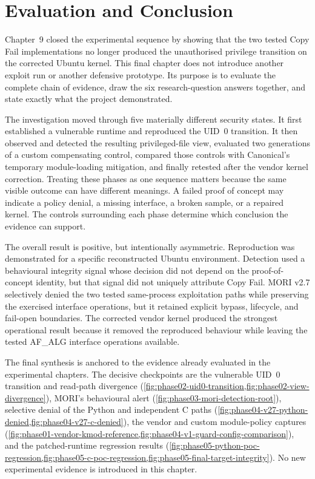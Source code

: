 \section{Evaluation and Conclusion}
\label{sec:evaluation-conclusion}

\graphicspath{{../evidence/}{evidence/}}

Chapter~9 closed the experimental sequence by showing that the two tested Copy
Fail implementations no longer produced the unauthorised privilege transition
on the corrected Ubuntu kernel. This final chapter does not introduce another
exploit run or another defensive prototype. Its purpose is to evaluate the
complete chain of evidence, draw the six research-question answers together,
and state exactly what the project demonstrated.

The investigation moved through five materially different security states. It
first established a vulnerable runtime and reproduced the UID~0 transition.
It then observed and detected the resulting privileged-file view, evaluated two
generations of a custom compensating control, compared those controls with
Canonical's temporary module-loading mitigation, and finally retested after the
vendor kernel correction. Treating these phases as one sequence matters because
the same visible outcome can have different meanings. A failed proof of concept
may indicate a policy denial, a missing interface, a broken sample, or a repaired
kernel. The controls surrounding each phase determine which conclusion the
evidence can support.

The overall result is positive, but intentionally asymmetric. Reproduction was
demonstrated for a specific reconstructed Ubuntu environment. Detection used a
behavioural integrity signal whose decision did not depend on the proof-of-
concept identity, but that signal did not uniquely attribute Copy Fail. MORI
v2.7 selectively denied the two tested same-process exploitation paths while
preserving the exercised interface operations, but it retained explicit bypass,
lifecycle, and fail-open boundaries. The corrected vendor kernel produced the
strongest operational result because it removed the reproduced behaviour while
leaving the tested AF\_ALG interface operations available.

\begin{evidencebox}
The final synthesis is anchored to the evidence already evaluated in the
experimental chapters. The decisive checkpoints are the vulnerable UID~0
transition and read-path divergence
(\cref{fig:phase02-uid0-transition,fig:phase02-view-divergence}), MORI's
behavioural alert (\cref{fig:phase03-mori-detection-root}), selective denial of
the Python and independent C paths
(\cref{fig:phase04-v27-python-denied,fig:phase04-v27-c-denied}), the vendor and
custom module-policy captures
(\cref{fig:phase01-vendor-kmod-reference,fig:phase04-v1-guard-config-comparison}),
and the patched-runtime regression results
(\cref{fig:phase05-python-poc-regression,fig:phase05-c-poc-regression,fig:phase05-final-target-integrity}).
No new experimental evidence is introduced in this chapter.
\end{evidencebox}

